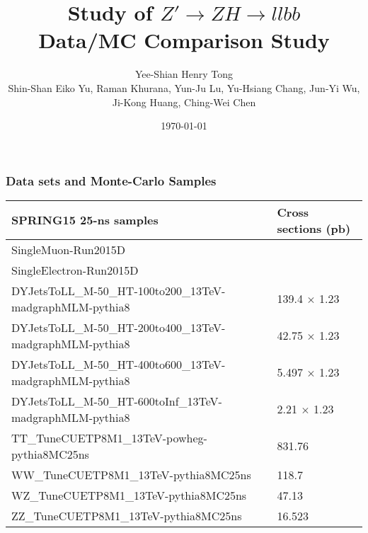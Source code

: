 \documentclass[7pt,aspectratio=1610]{beamer}
\title[]{\Large{Study of $Z' \rightarrow ZH \rightarrow llbb$ \\ Data/MC Comparison Study}} %
\author[Henry Tong]{\Large{Yee-Shian Henry Tong}\\[3mm] \small{Shin-Shan Eiko Yu, Raman Khurana, Yun-Ju Lu, Yu-Hsiang Chang, Jun-Yi Wu, Ji-Kong Huang, Ching-Wei Chen}} %
\institute[NCU]{ %
  National Central University \\ %
  \medskip
  \textit{Dibosons Resonance Meeting}
}
\date{\today} %
\renewcommand{\arraystretch}{1.2}
\begin{document}
\begin{frame}
  \vspace*{-1cm}
  \enlargethispage{1cm}
  \titlepage %
\end{frame}



\everymath{\displaystyle}
\renewcommand{\arraystretch}{1.25}

\begin{frame}
  \frametitle{Data sets and Monte-Carlo Samples}
  \justifying 
  \begin{tiny}
    \begin{center}
      \begin{tabular}{ | l | l | }
        \hline
        \bf SPRING15 25-ns samples & \bf Cross sections (pb) \\
        \hline
        SingleMuon-Run2015D     & \\
        \hline 
        SingleElectron-Run2015D & \\
        \hline
        DYJetsToLL\_M-50\_HT-100to200\_13TeV-madgraphMLM-pythia8
        & 139.4 $\times$ 1.23  \\
        \hline
        DYJetsToLL\_M-50\_HT-200to400\_13TeV-madgraphMLM-pythia8
        & 42.75 $\times$ 1.23  \\
        \hline
        DYJetsToLL\_M-50\_HT-400to600\_13TeV-madgraphMLM-pythia8
        & 5.497 $\times$ 1.23  \\
        \hline
        DYJetsToLL\_M-50\_HT-600toInf\_13TeV-madgraphMLM-pythia8
        & 2.21 $\times$ 1.23   \\
        \hline  
        TT\_TuneCUETP8M1\_13TeV-powheg-pythia8MC25ns
        & 831.76      \\
        \hline
        WW\_TuneCUETP8M1\_13TeV-pythia8MC25ns 
        & 118.7       \\
        \hline
        WZ\_TuneCUETP8M1\_13TeV-pythia8MC25ns 
        & 47.13       \\
        \hline
        ZZ\_TuneCUETP8M1\_13TeV-pythia8MC25ns 
        & 16.523      \\
        \hline
      \end{tabular}
    \end{center}
  \end{tiny}
\end{frame}
\end{document}
